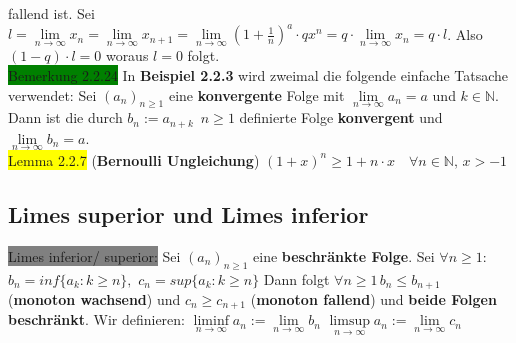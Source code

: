 \documentclass[landscape, 10pt]{article}
\newcommand{\N}{\mathbb{N}}
\begin{document}
\begin{multicols}{3}
{                     fallend} ist.
                     Sei \textcolor{NavyBlue}{$l=\lim\limits_{n\to\infty}x_n
                     =\lim\limits_{n\to\infty}x_{n+1}
                     =\lim\limits_{n\to\infty}(1+\frac{1}{n})^a\cdot qx^n
                     =q\cdot\lim\limits_{n\to\infty}x_n=q\cdot l$}.
                     Also \textcolor{NavyBlue}{$(1-q)\cdot l=0$} woraus 
                     \textcolor{NavyBlue}{$l=0$} folgt.\\
              \colorbox{green}{Bemerkung 2.2.24} 
                     In \textbf{Beispiel 2.2.3} wird zweimal die 
                     folgende einfache Tatsache verwendet: Sei 
                     \textcolor{NavyBlue}{$(a_n)_{n\geqslant1}$} eine 
                     \textbf{konvergente} Folge mit 
                     \textcolor{NavyBlue}{$\lim\limits_{n\to\infty}a_n=a$}
                     und 
                     \textcolor{NavyBlue}{$k\in\N$}. Dann ist die durch 
                     \textcolor{NavyBlue}{$b_n:=a_{n+k}\enspace n\geqslant1$} 
                     definierte Folge \textbf{konvergent} und 
                     \textcolor{NavyBlue}{$\lim\limits_{n\to\infty}b_n=a$}.\\
              \colorbox{yellow}{Lemma 2.2.7} 
              (\textbf{Bernoulli Ungleichung}) 
                     \textcolor{NavyBlue}{
                     $(1+x)^n\geqslant 1+n\cdot x \quad\forall n\in\N,\, x>-1$}
       \subsection{Limes superior und Limes inferior}
              \colorbox{gray}{Limes inferior/ superior:} 
                     Sei \textcolor{NavyBlue}{$(a_n)_{n\geqslant 1}$}
                     eine \textbf{beschränkte Folge}. Sei 
                     \textcolor{NavyBlue}{
                     $\forall n\geqslant1$: $b_n=inf\{a_k:k\geqslant n\},$
                     $c_n=sup\{a_k:k\geqslant n\}$} Dann folgt 
                     \textcolor{NavyBlue}{$\forall n\geqslant1\,b_n\leqslant b_{n+1}$} 
                     (\textbf{monoton wachsend}) und 
                     \textcolor{NavyBlue}{$c_n\geqslant c_{n+1}$} (\textbf{monoton fallend}) 
                     und \textbf{beide Folgen beschränkt}. Wir definieren: 
                     \textcolor{NavyBlue}{
                     $\liminf\limits_{n\to\infty}a_n:=\lim\limits_{n\to\infty}b_n$ \qquad
                     $\limsup\limits_{n\to\infty}a_n:=\lim\limits_{n\to\infty}c_n$}

\end{multicols}
\end{document}
